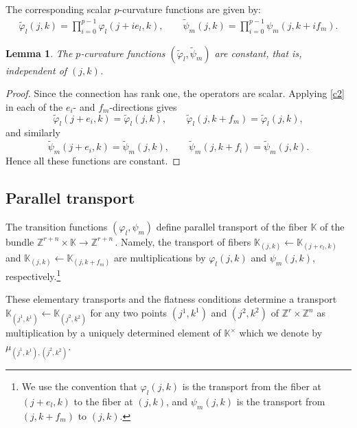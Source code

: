\documentclass[12pt]{amsart}
\newtheorem{lem}[thm]{Lemma}
\theoremstyle{definition} %
\numberwithin{equation}{section}
\theoremstyle{definition}
\let\phi\varphi
\def\Z{{\mathbb Z}}
\def\K{{\mathbb K}}
\begin{document}
The corresponding scalar $p$-curvature functions are given by:
\begin{align*}
\tilde{\phi}_l(j,k) = \prod_{i=0}^{p-1} \phi_l(j + i e_l, k),
\qquad
\tilde{\psi}_m(j,k) = \prod_{i=0}^{p-1} \psi_m(j, k + i f_m).
\end{align*}

\begin{lem}
\label{lem 2.2}
The $p$-curvature functions $(\tilde \phi_l, \tilde\psi_m)$ are constant,
that is, independent of $(j,k)$.


\end{lem}



\begin{proof}
Since the connection has rank one, the operators are scalar. Applying
\eqref{c2} in each of the $e_i$- and $f_m$-directions gives
\[
\widetilde\phi_l(j+e_i,k)=\widetilde\phi_l(j,k),\qquad
\widetilde\phi_l(j,k+f_m)=\widetilde\phi_l(j,k),
\]
and similarly
\[
\widetilde\psi_m(j+e_i,k)=\widetilde\psi_m(j,k),\qquad
\widetilde\psi_m(j,k+f_i)=\widetilde\psi_m(j,k).
\]
Hence all these functions are constant.
\end{proof}















\subsection{Parallel transport}

The transition functions $(\phi_l, \psi_m)$
define parallel transport of the fiber $\K$ of the bundle
$\Z^{r+n}\times \K\to \Z^{r+n}$\,.
Namely, the transport of fibers
$\K_{(j,k)} \leftarrow \K_{(j +e_l,k)}$ and
$\K_{(j,k)} \leftarrow \K_{(j,k+f_m)}$ are multiplications by
$\phi_l(j,k)$ and $\psi_m(j,k)$, respectively.\footnote{We use the convention that $\phi_l(j,k)$ is the transport from the fiber at $(j+e_l,k)$ to the fiber at $(j,k)$, and $\psi_m(j,k)$ is the transport from $(j,k+f_m)$ to $(j,k)$.}



These elementary transports and the flatness conditions determine a transport
$\K_{(j^1,k^1)} \leftarrow \K_{(j^2,k^2)}$ for any two points
$(j^1, k^1)$ and $(j^2, k^2)$ of  $\Z^{r}\times \Z^n$
as multiplication by a uniquely determined element of $\K^\times$ which we denote by
$\mu_{(j^1, k^1),(j^2, k^2)}$.
\end{document}
